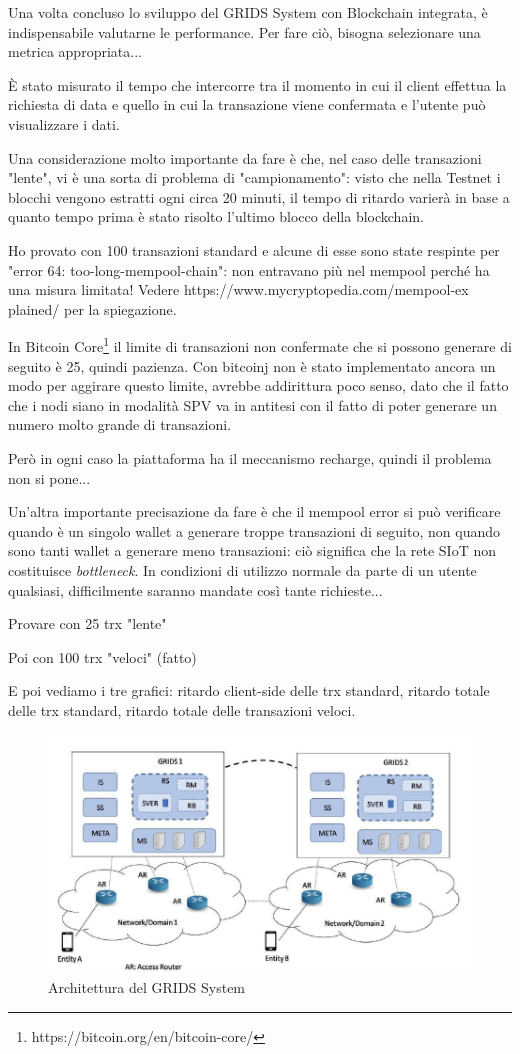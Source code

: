 Una volta concluso lo sviluppo del GRIDS System con Blockchain integrata, è indispensabile valutarne le performance.
Per fare ciò, bisogna selezionare una metrica appropriata...


È stato misurato il tempo che intercorre tra il momento in cui il client effettua la richiesta di data e quello in cui la transazione viene confermata e l'utente può visualizzare i dati.

Una considerazione molto importante da fare è che, nel caso delle transazioni "lente", vi è una sorta di problema di "campionamento": visto che nella Testnet i blocchi vengono estratti ogni circa 20 minuti, il tempo di ritardo varierà in base a quanto tempo prima è stato risolto l'ultimo blocco della blockchain.

Ho provato con 100 transazioni standard e alcune di esse sono state respinte per "error 64: too-long-mempool-chain": non entravano più nel mempool perché ha una misura limitata! Vedere https://www.mycryptopedia.com/mempool-ex plained/ per la spiegazione.

In Bitcoin Core\footnote{https://bitcoin.org/en/bitcoin-core/} il limite di transazioni non confermate che si possono generare di seguito è 25, quindi pazienza. Con bitcoinj non è stato implementato ancora un modo per aggirare questo limite, avrebbe addirittura poco senso, dato che il fatto che i nodi siano in modalità SPV va in antitesi con il fatto di poter generare un numero molto grande di transazioni.

Però in ogni caso la piattaforma ha il meccanismo recharge, quindi il problema non si pone...

Un'altra importante precisazione da fare è che il mempool error si può verificare quando è un singolo wallet a generare troppe transazioni di seguito, non quando sono tanti wallet a generare meno transazioni: ciò significa che la rete SIoT non costituisce \textit{bottleneck}. In condizioni di utilizzo normale da parte di un utente qualsiasi, difficilmente saranno mandate così tante richieste...

Provare con 25 trx "lente"

Poi con 100 trx "veloci" (fatto)

E poi vediamo i tre grafici: ritardo client-side delle trx standard, ritardo totale delle trx standard, ritardo totale delle transazioni veloci.


\begin{figure}[h!t]
\centerline{\includegraphics[scale=0.5]{img/GRIDSarch}}
\caption{Architettura del GRIDS System}
\label{f:grids:arch}
\end{figure}